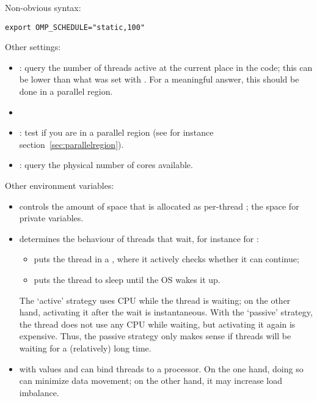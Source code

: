 Non-obvious syntax:
\begin{verbatim}
export OMP_SCHEDULE="static,100"
\end{verbatim}

Other settings:
\begin{itemize}
\item{}: query the number of threads
  active at the current place in the code; this can be lower than what
  was set with . For a meaningful answer, this
  should be done in a parallel region.
\item{}
\item{}: test if you are in a parallel
  region (see for instance section~\ref{sec:parallelregion}).
\item{}: query the physical number of cores available.
\end{itemize}

Other environment variables:
\begin{itemize}
\item {} controls the amount of space that is
  allocated as per-thread ; the space for private
  variables.
\item {} determines the behaviour of
  threads that wait, for instance for :
  \begin{itemize}
  \item {} puts the thread in a , where
    it actively checks whether it can continue;
  \item {} puts the thread to sleep until the \ac{OS} wakes
    it up.
  \end{itemize}
  The `active' strategy uses CPU while the thread is waiting; on the
  other hand, activating it after the wait is instantaneous. With the
  `passive' strategy, the thread does not use any CPU while waiting,
  but activating it again is expensive. Thus, the passive strategy
  only makes sense if threads will be waiting for a (relatively) long
  time.
\item {} with values  and 
  can bind threads to a processor. On the one hand, doing so can
  minimize data movement; on the other hand, it may increase load
  imbalance.
\end{itemize}



